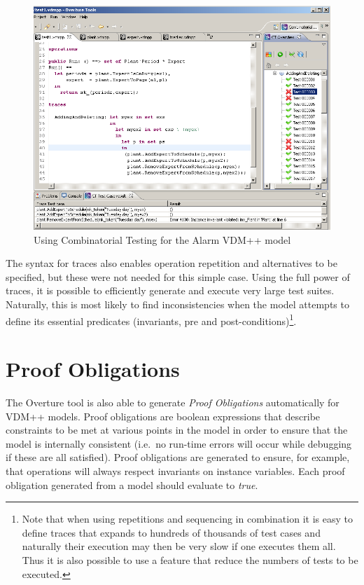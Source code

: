 \begin{figure}[htbp]
\begin{center}
\includegraphics[width=4.5in]{figures/tracesalarm}
\caption{Using Combinatorial Testing for the Alarm VDM++ model\label{fig:stracesalarm}}
\end{center}
\end{figure}

The syntax for traces also enables operation repetition and alternatives to be
specified, but these were not needed for this simple case. Using the full power
of traces, it is possible to efficiently generate and execute very large test
suites. Naturally, this is most likely to find inconsistencies when the model
attempts to define its essential predicates (invariants, pre and
post-conditions)\footnote{Note that when using repetitions and
  sequencing in combination it is easy to define traces that expands
  to hundreds of thousands of test cases and naturally their execution
  may then be very slow if one executes them all. Thus it is
  also possible to use a feature that reduce the numbers of tests to be
  executed.}.

\section{Proof Obligations}\label{sec:PO}

The Overture tool is also able to generate \emph{Proof Obligations}
automatically for VDM++ models. Proof obligations are boolean
expressions that describe constraints to be met at various points in
the model in order to ensure that the model is internally consistent
(i.e.\ no run-time errors will occur while debugging if these are all
satisfied). Proof obligations are generated to ensure, for example,
that operations will always respect invariants on instance
variables. Each proof obligation generated from a model should
evaluate to \emph{true}.

